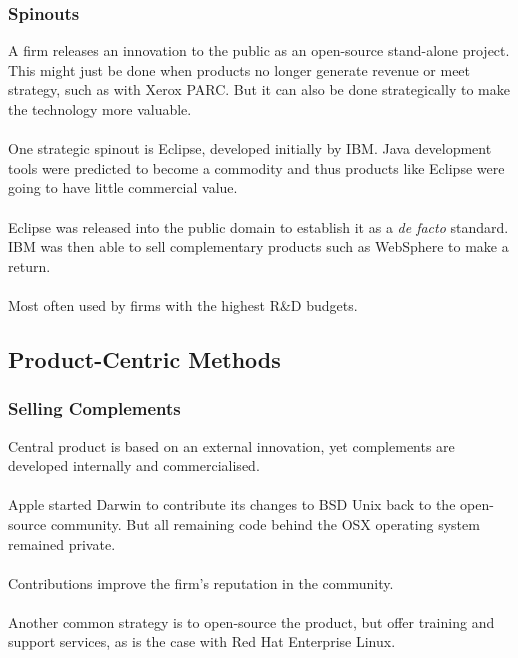 \documentclass{beamer}
\begin{document}

\begin{frame}
\frametitle{Spinouts}
A firm releases an innovation to the public as an open-source stand-alone project. This might just be done when products no longer generate revenue or meet strategy, such as with Xerox PARC. But it can also be done strategically to make the technology more valuable.\\~\\

One strategic spinout is Eclipse, developed initially by IBM. Java development tools were predicted to become a commodity and thus products like Eclipse were going to have little commercial value.\\~\\

Eclipse was released into the public domain to establish it as a \textit{de facto} standard. IBM was then able to sell complementary products such as WebSphere to make a return.\\~\\

Most often used by firms with the highest R\&D budgets.
\end{frame}

\subsection{Product-Centric Methods}

\begin{frame}
\frametitle{Selling Complements}
Central product is based on an external innovation, yet complements are developed internally and commercialised.\\~\\

Apple started Darwin to contribute its changes to BSD Unix back to the open-source community. But all remaining code behind the OSX operating system remained private.\\~\\

Contributions improve the firm's reputation in the community.\\~\\

Another common strategy is to open-source the product, but offer training and support services, as is the case with Red Hat Enterprise Linux.
\end{frame}
\end{document}

